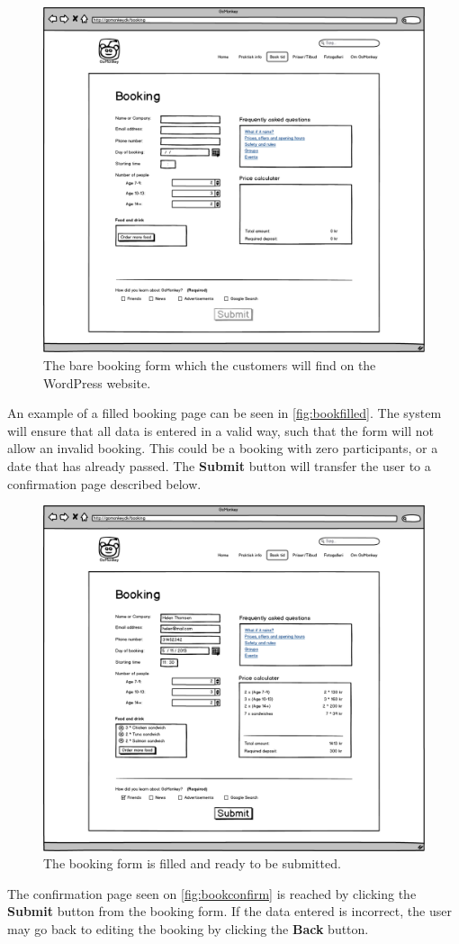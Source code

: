 \begin{figure}[htbp]
    \centering
        \includegraphics[width=.6\textwidth]{figures/mockup/booking_initial.png}
	    \caption{The bare booking form which the customers will find on the WordPress website.}
        \label{fig:bookinitial}
\end{figure}

An example of a filled booking page can be seen in \autoref{fig:bookfilled}.
The system will ensure that all data is entered in a valid way, such that the
form will not allow an invalid booking. This could be a booking with zero
participants, or a date that has already passed. The \textbf{Submit} button will
transfer the user to a confirmation page described below.

\begin{figure}[htbp]
    \centering
        \includegraphics[width=.6\textwidth]{figures/mockup/booking_filled.png}
	    \caption{The booking form is filled and ready to be submitted.}
        \label{fig:bookfilled}
\end{figure}

The confirmation page seen on \autoref{fig:bookconfirm} is reached by clicking
the \textbf{Submit} button from the booking form. If the data entered is
incorrect, the user may go back to editing the booking by clicking the
\textbf{Back} button.

